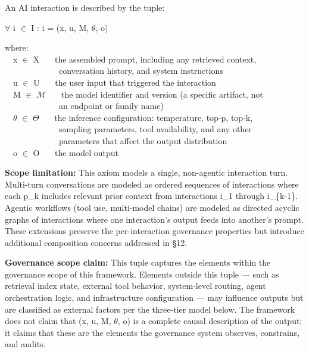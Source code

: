 \begin{caxiom}

An AI interaction is described by the tuple:

\begin{cladnote}
$\forall$ i $\in$ I : i = (x, u, M, $\theta$, o)
\par\smallskip
where:\\
~~x $\in$ X~~~\textemdash{} the assembled prompt, including any retrieved context,\\
~~~~~~~~~~~~~conversation history, and system instructions\\
~~u $\in$ U~~~\textemdash{} the user input that triggered the interaction\\
~~M $\in$ $\mathcal{M}$~~~\textemdash{} the model identifier and version (a specific artifact, not\\
~~~~~~~~~~~~~an endpoint or family name)\\
~~$\theta$ $\in$ $\Theta$~~~\textemdash{} the inference configuration: temperature, top-p, top-k,\\
~~~~~~~~~~~~~sampling parameters, tool availability, and any other\\
~~~~~~~~~~~~~parameters that affect the output distribution\\
~~o $\in$ O~~~\textemdash{} the model output
\end{cladnote}


\end{caxiom}

\textbf{Scope limitation:} This axiom models a single, non-agentic interaction turn. Multi-turn conversations are modeled as ordered sequences of interactions where each p\_\allowbreak{}k includes relevant prior context from interactions i\_\allowbreak{}1 through i\_\allowbreak{}\{k-1\}. Agentic workflows (tool use, multi-model chains) are modeled as directed acyclic graphs of interactions where one interaction's output feeds into another's prompt. These extensions preserve the per-interaction governance properties but introduce additional composition concerns addressed in \S{}12.

\textbf{Governance scope claim:} This tuple captures the elements within the governance scope of this framework. Elements outside this tuple --- such as retrieval index state, external tool behavior, system-level routing, agent orchestration logic, and infrastructure configuration --- may influence outputs but are classified as external factors per the three-tier model below. The framework does not claim that (x, u, M, $\theta$, o) is a complete causal description of the output; it claims that these are the elements the governance system observes, constrains, and audits.

